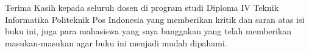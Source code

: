 Terima Kasih kepada seluruh dosen di program studi Diploma IV Teknik Informatika Politeknik Pos Indonesia yang memberikan kritik dan saran atas isi buku ini, juga para mahasiswa yang saya banggakan yang telah memberikan masukan-masukan agar buku ini menjadi mudah dipahami.
